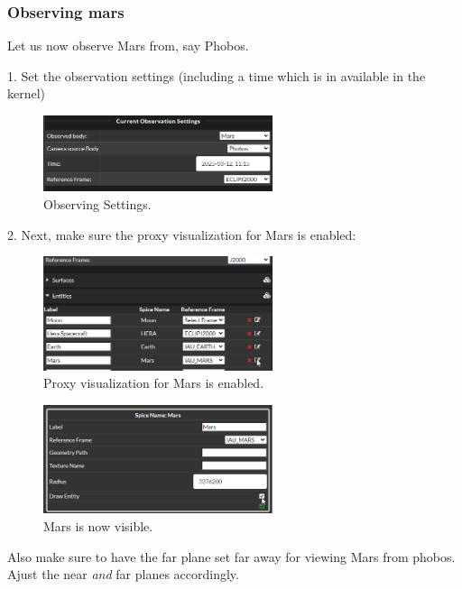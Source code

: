 \hypertarget{observing-mars}{%
	\subsubsection{Observing mars}\label{observing-mars}}

Let us now observe Mars from, say Phobos.

1. Set the observation settings (including a time which is in available in the kernel)

\begin{figure}[h!]
	\centering
	\includegraphics[width=0.6\textwidth]{pics/observe.png}
	\caption{Observing Settings.}
\end{figure}

2. Next, make sure the proxy visualization for Mars is enabled:

\begin{figure}[h!]
	\centering
	\includegraphics[width=0.6\textwidth]{./pics/MarsProperties.png}
	\caption{Proxy visualization for Mars is enabled.}
\end{figure}

\begin{figure}[h!]
	\centering
	\includegraphics[width=0.6\textwidth]{./pics/visibleMars.png}
	\caption{Mars is now visible.}
\end{figure}

Also make sure to have the far plane set far away for viewing Mars from
phobos. Ajust the near \emph{and} far planes accordingly.


